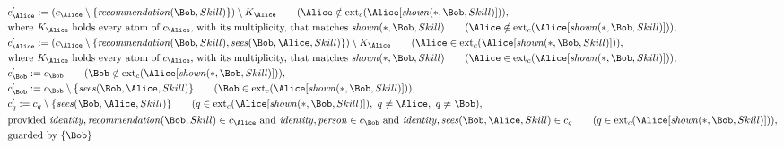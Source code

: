 \begin{align*}
&
c'_
{
\Alice
}
 := 
(c_
{
\Alice
}
 \setminus 
\{
\mathit{\detokenize{
recommendation
}}
(
\Bob
,
Skill
)
\}
) \setminus K_
{
\Alice
}
 \qquad (
\Alice
 \notin 
\mathrm{ext}_c(
\Alice
[
\mathit{\detokenize{
shown
}}
(
\ast
,
\Bob
,
Skill
)
]
)
)
,\\
&
\text{where } K_
{
\Alice
}
 \text{ holds every atom of } c_
{
\Alice
}
 \text{, with its multiplicity, that matches } 
\mathit{\detokenize{
shown
}}
(
\ast
,
\Bob
,
Skill
)
 \qquad (
\Alice
 \notin 
\mathrm{ext}_c(
\Alice
[
\mathit{\detokenize{
shown
}}
(
\ast
,
\Bob
,
Skill
)
]
)
)
,\\
&
c'_
{
\Alice
}
 := 
(c_
{
\Alice
}
 \setminus 
\{
\mathit{\detokenize{
recommendation
}}
(
\Bob
,
Skill
)
,
\mathit{\detokenize{
sees
}}
(
\Bob
,
\Alice
,
Skill
)
\}
) \setminus K_
{
\Alice
}
 \qquad (
\Alice
 \in 
\mathrm{ext}_c(
\Alice
[
\mathit{\detokenize{
shown
}}
(
\ast
,
\Bob
,
Skill
)
]
)
)
,\\
&
\text{where } K_
{
\Alice
}
 \text{ holds every atom of } c_
{
\Alice
}
 \text{, with its multiplicity, that matches } 
\mathit{\detokenize{
shown
}}
(
\ast
,
\Bob
,
Skill
)
 \qquad (
\Alice
 \in 
\mathrm{ext}_c(
\Alice
[
\mathit{\detokenize{
shown
}}
(
\ast
,
\Bob
,
Skill
)
]
)
)
,\\
&
c'_
{
\Bob
}
 := 
c_
{
\Bob
}
 \qquad (
\Bob
 \notin 
\mathrm{ext}_c(
\Alice
[
\mathit{\detokenize{
shown
}}
(
\ast
,
\Bob
,
Skill
)
]
)
)
,\\
&
c'_
{
\Bob
}
 := 
c_
{
\Bob
}
 \setminus 
\{
\mathit{\detokenize{
sees
}}
(
\Bob
,
\Alice
,
Skill
)
\}
 \qquad (
\Bob
 \in 
\mathrm{ext}_c(
\Alice
[
\mathit{\detokenize{
shown
}}
(
\ast
,
\Bob
,
Skill
)
]
)
)
,\\
&
c'_
q
 := 
c_
q
 \setminus 
\{
\mathit{\detokenize{
sees
}}
(
\Bob
,
\Alice
,
Skill
)
\}
 \qquad (
q
 \in 
\mathrm{ext}_c(
\Alice
[
\mathit{\detokenize{
shown
}}
(
\ast
,
\Bob
,
Skill
)
]
)
,\ 
q \neq 
\Alice
,\ 
q \neq 
\Bob
)
,\\
&
\text{provided } 
\mathit{\detokenize{
identity
}}
,
\mathit{\detokenize{
recommendation
}}
(
\Bob
,
Skill
)
 \in c_
{
\Alice
}
 \text{ and } 
\mathit{\detokenize{
identity
}}
,
\mathit{\detokenize{
person
}}
 \in c_
{
\Bob
}
 \text{ and } 
\mathit{\detokenize{
identity
}}
,
\mathit{\detokenize{
sees
}}
(
\Bob
,
\Alice
,
Skill
)
 \in c_
q
 \qquad (
q \in 
\mathrm{ext}_c(
\Alice
[
\mathit{\detokenize{
shown
}}
(
\ast
,
\Bob
,
Skill
)
]
)
)
,\\
&
\text{guarded by } \{
\Bob
\}
\end{align*}
